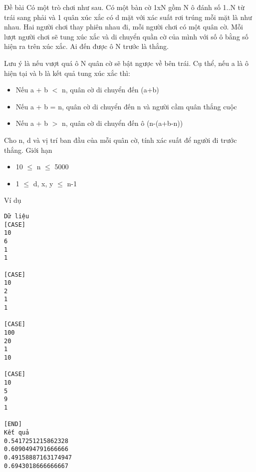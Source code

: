 Đề bài
Có một trò chơi như sau. Có một bàn cờ 1xN gồm N ô đánh số 1..N từ trái sang phải và 1 quân xúc xắc có d mặt với xác suất rơi trúng mỗi mặt là như nhau. Hai người chơi thay phiên nhau đi, mỗi người chơi có một quân cờ. Mỗi lượt người chơi sẽ tung xúc xắc và di chuyển quần cờ của mình với số ô bằng số hiện ra trên xúc xắc. Ai đến được ô N trước là thắng.  

   Lưu ý là nếu vượt quá ô N quân cờ sẽ bật ngược về bên trái. Cụ thể, nếu a là ô hiện tại và b là kết quả tung xúc xắc thì:  
\begin{itemize}
	\item     Nếu a + b $<$ n, quân cờ di chuyển đến (a+b)   
	\item     Nếu a + b = n, quân cờ di chuyển đến n và người cầm quân  thắng cuộc   
	\item     Nếu a + b $>$ n, quân cờ di chuyển đến ô (n-(a+b-n))   
\end{itemize}

   Cho n, d và vị trí ban đầu của mỗi quân cờ, tính xác suất để người đi trước thắng.
Giới hạn
\begin{itemize}
	\item     10  $\le$  n  $\le$  5000   
	\item     1  $\le$  d, x, y  $\le$  n-1   
\end{itemize}
Ví dụ
\begin{verbatim}
Dữ liệu
[CASE]
10
6
1
1

[CASE]
10
2
1
1

[CASE]
100
20
1
10

[CASE]
10
5
9
1

[END]
Kết quả
0.5417251215862328
0.6090494791666666
0.49158887163174947
0.6943018666666667
\end{verbatim}
